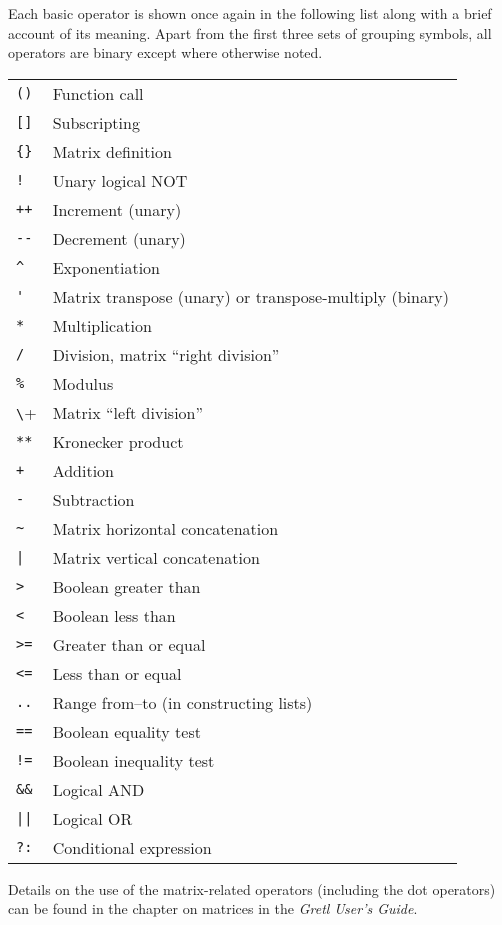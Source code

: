 Each basic operator is shown once again in the following list along
with a brief account of its meaning. Apart from the first three sets
of grouping symbols, all operators are binary except where otherwise
noted.

\begin{longtable}{ll}
\verb|()| & Function call \\
\verb|[]|  & Subscripting \\
\verb|{}|  & Matrix definition \\
\texttt{!} & Unary logical NOT \\
\texttt{++} & Increment (unary) \\
\verb|--| & Decrement (unary) \\
\verb|^|  & Exponentiation \\
\verb|'|  & Matrix transpose (unary) or transpose-multiply (binary) \\
\texttt{*} & Multiplication \\
\texttt{/} & Division, matrix ``right division'' \\
\texttt{\%} & Modulus \\
\verb+\+    & Matrix ``left division'' \\
\texttt{**} & Kronecker product \\
\texttt{+} & Addition \\
\texttt{-} & Subtraction \\
\verb|~| & Matrix horizontal concatenation \\
\verb+|+ & Matrix vertical concatenation \\
\verb|>| & Boolean greater than \\
\verb|<| & Boolean less than \\
\verb|>=| & Greater than or equal \\
\verb|<=| & Less than or equal \\
\texttt{..} & Range from--to (in constructing lists) \\
\texttt{==} & Boolean equality test \\
\texttt{!=} & Boolean inequality test \\
\verb|&&| & Logical AND \\
\verb+||+ & Logical OR \\
\texttt{?:} & Conditional expression \\
\end{longtable}

Details on the use of the matrix-related operators (including the dot
operators) can be found in the chapter on matrices in the
\textit{Gretl User's Guide}.


